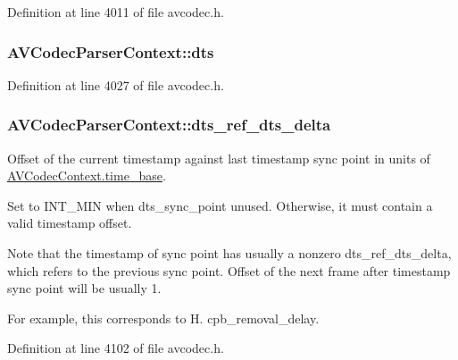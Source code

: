 Definition at line 4011 of file avcodec.\+h.

\subsubsection[{\texorpdfstring{dts}{dts}}]{ A\+V\+Codec\+Parser\+Context\+::dts}\hypertarget{struct_a_v_codec_parser_context_ae3146f05127d9d4ba5a140a869bdab35}{}\label{struct_a_v_codec_parser_context_ae3146f05127d9d4ba5a140a869bdab35}


Definition at line 4027 of file avcodec.\+h.

\subsubsection[{\texorpdfstring{dts\+\_\+ref\+\_\+dts\+\_\+delta}{dts_ref_dts_delta}}]{ A\+V\+Codec\+Parser\+Context\+::dts\+\_\+ref\+\_\+dts\+\_\+delta}\hypertarget{struct_a_v_codec_parser_context_a0938e2e1fb7543727fded955ccce88ca}{}\label{struct_a_v_codec_parser_context_a0938e2e1fb7543727fded955ccce88ca}
Offset of the current timestamp against last timestamp sync point in units of \hyperlink{struct_a_v_codec_context_ab7bfeb9fa5840aac090e2b0bd0ef7589}{A\+V\+Codec\+Context.\+time\+\_\+base}.

Set to I\+N\+T\+\_\+\+M\+IN when dts\+\_\+sync\+\_\+point unused. Otherwise, it must contain a valid timestamp offset.

Note that the timestamp of sync point has usually a nonzero dts\+\_\+ref\+\_\+dts\+\_\+delta, which refers to the previous sync point. Offset of the next frame after timestamp sync point will be usually 1.

For example, this corresponds to H. cpb\+\_\+removal\+\_\+delay. 

Definition at line 4102 of file avcodec.\+h.

